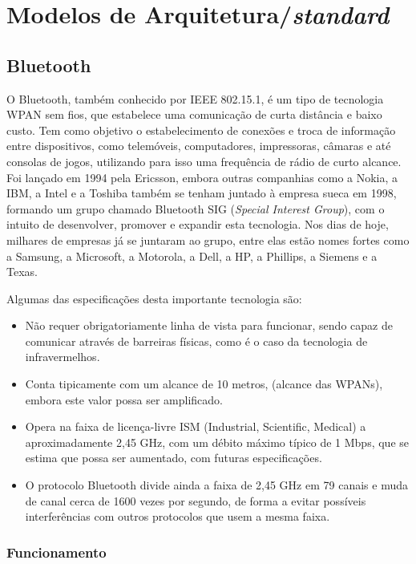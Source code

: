 \documentclass[conference]{IEEEtran}
\begin{document}
\section{Modelos de Arquitetura/\textit{standard}}

\subsection{Bluetooth} \label{bluetooth}

O Bluetooth, também conhecido por IEEE 802.15.1, é um tipo de tecnologia WPAN sem fios, que estabelece uma comunicação de curta distância e baixo custo. 
Tem como objetivo o estabelecimento de conexões e troca de informação entre dispositivos, como telemóveis, computadores, impressoras, câmaras e até consolas de jogos, utilizando para isso uma frequência de rádio de curto alcance. 
Foi lançado em 1994 pela Ericsson, embora outras companhias como a Nokia, a IBM, a Intel e a Toshiba também se tenham juntado à empresa sueca em 1998, formando um grupo chamado Bluetooth SIG (\textit{Special Interest Group}), com o intuito de desenvolver, promover e expandir esta tecnologia. 
Nos dias de hoje, milhares de empresas já se juntaram ao grupo, entre elas estão nomes fortes como a Samsung, a Microsoft, a Motorola, a Dell, a HP, a Phillips, a Siemens e a Texas.

Algumas das especificações desta importante tecnologia são:

\begin{itemize}

 \item Não requer obrigatoriamente linha de vista para funcionar, sendo capaz de comunicar através de barreiras físicas, como é o caso da tecnologia de infravermelhos.
 \item Conta tipicamente com um alcance de 10 metros, (alcance das WPANs), embora este valor possa ser amplificado. 
 \item Opera na faixa de licença-livre ISM (Industrial, Scientific, Medical) a aproximadamente 2,45 GHz, com um débito máximo típico de 1 Mbps, que se estima que possa ser aumentado, com futuras especificações.
 \item O protocolo Bluetooth divide ainda a faixa de 2,45 GHz em 79 canais e muda de canal cerca de 1600 vezes por segundo, de forma a evitar possíveis interferências com outros protocolos que usem a mesma faixa.

\end{itemize}

\subsubsection{Funcionamento}
\end{document}
